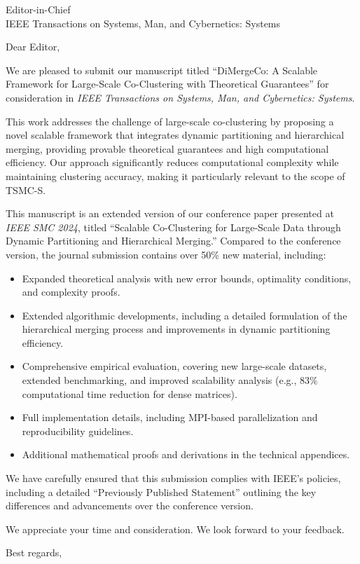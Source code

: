 \documentclass[11pt]{letter}
\begin{document}
\begin{letter}{Editor-in-Chief\\
IEEE Transactions on Systems, Man, and Cybernetics: Systems}
\opening{Dear Editor,}

We are pleased to submit our manuscript titled ``DiMergeCo: A Scalable Framework for Large-Scale Co-Clustering with Theoretical Guarantees'' for consideration in \emph{IEEE Transactions on Systems, Man, and Cybernetics: Systems}. 

This work addresses the challenge of large-scale co-clustering by proposing a novel scalable framework that integrates dynamic partitioning and hierarchical merging, providing provable theoretical guarantees and high computational efficiency. Our approach significantly reduces computational complexity while maintaining clustering accuracy, making it particularly relevant to the scope of TSMC-S.

This manuscript is an extended version of our conference paper presented at \emph{IEEE SMC 2024}, titled ``Scalable Co-Clustering for Large-Scale Data through Dynamic Partitioning and Hierarchical Merging.'' Compared to the conference version, the journal submission contains over 50\% new material, including:

\begin{itemize}
  \item Expanded theoretical analysis with new error bounds, optimality conditions, and complexity proofs.
  \item Extended algorithmic developments, including a detailed formulation of the hierarchical merging process and improvements in dynamic partitioning efficiency.
  \item Comprehensive empirical evaluation, covering new large-scale datasets, extended benchmarking, and improved scalability analysis (e.g., 83\% computational time reduction for dense matrices).
  \item Full implementation details, including MPI-based parallelization and reproducibility guidelines.
  \item Additional mathematical proofs and derivations in the technical appendices.
\end{itemize}

We have carefully ensured that this submission complies with IEEE's policies, including a detailed ``Previously Published Statement'' outlining the key differences and advancements over the conference version.

We appreciate your time and consideration. We look forward to your feedback.

\closing{Best regards,}

\end{letter}
\end{document}

